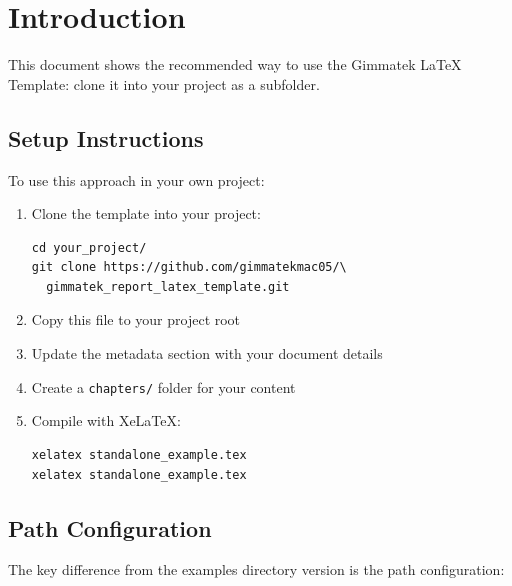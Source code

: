 \documentclass[12pt,a4paper]{gimmatek-report-template}
\begin{document}
\frontmatter
\makefrontmatter

\mainmatter

\chapter{Introduction}

This document shows the recommended way to use the Gimmatek LaTeX Template:
clone it into your project as a subfolder.

\section{Setup Instructions}

To use this approach in your own project:

\begin{enumerate}
\item Clone the template into your project:
\begin{verbatim}
cd your_project/
git clone https://github.com/gimmatekmac05/\
  gimmatek_report_latex_template.git
\end{verbatim}

\item Copy this file to your project root

\item Update the metadata section with your document details

\item Create a \texttt{chapters/} folder for your content

\item Compile with XeLaTeX:
\begin{verbatim}
xelatex standalone_example.tex
xelatex standalone_example.tex
\end{verbatim}
\end{enumerate}

\section{Path Configuration}

The key difference from the examples directory version is the path configuration:
\end{document}
